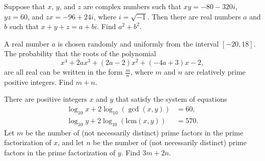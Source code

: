\begin{question}[name={2018 AIME II, \href{https://artofproblemsolving.com/community/c4p10083313}{Problem 5}}]
	Suppose that $x$, $y$, and $z$ are complex numbers such that $xy = -80-320i$, $yz =  60$, and $zx =  -96+24i$, where $i = \sqrt{-1}$. Then there are real numbers $a$ and $b$ such that $x+y+z = a+bi$. Find $a^2 + b^2$.	
\end{question}


%	












\begin{question}[name={2018 AIME II, \href{https://artofproblemsolving.com/community/c4p10083255}{Problem 6}}]
	A real number $a$ is chosen randomly and uniformly from the interval $[-20, 18]$. The probability that the roots of the polynomial\[x^4 + 2ax^3 + (2a-2)x^2 + (-4a+3)x - 2,\]are all real can be written in the form $\tfrac{m}{n}$, where $m$ and $n$ are relatively prime positive integers. Find $m+n$.
\end{question}


%	









\begin{question}[name={2019 AIME I, \href{https://artofproblemsolving.com/community/c4p11972709}{Problem 7}}]
	There are positive integers $x$ and $y$ that satisfy the system of equations
	\begin{align*}
		\log_{10} x + 2 \log_{10} (\gcd(x,y)) &= 60, \\ \log_{10} y + 2 \log_{10} (\text{lcm}(x,y)) &= 570.
	\end{align*}Let $m$ be the number of (not necessarily distinct) prime factors in the prime factorization of $x$, and let $n$ be the number of (not necessarily distinct) prime factors in the prime factorization of $y$. Find $3m+2n$.
\end{question}


%	











